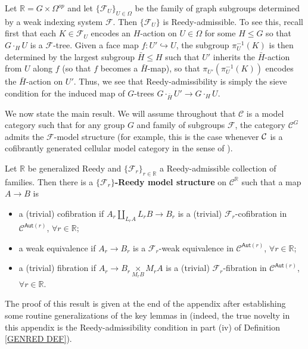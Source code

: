 \documentclass[a4paper,10pt
,draft
]{article}%
\begin{document}
\begin{example}\label{FGRAPHREEDY EX}
	Let $\mathbb{R} = G \times \Omega^{op}$ and let
	$\{\mathcal{F}_U\}_{U \in \Omega}$ be the family of graph subgroups determined by a weak indexing system $\mathcal{F}$.
	Then $\{\mathcal{F}_U\}$ is Reedy-admissible.
	To see this, recall first that each $K \in \mathcal{F}_U$ encodes 
	an $H$-action on $U \in \Omega$ for some $H \leq G$
	so that $G \cdot_H U$ is a $\mathcal{F}$-tree.
	Given a face map $f \colon U' \hookrightarrow U$, 
	the subgroup $\pi^{-1}_U(K)$ is then determined by the largest subgroup $\bar{H}\leq H$ such that 
	$U'$ inherits the $\bar{H}$-action from $U$ along $f$ (so that $f$ becomes a $\bar{H}$-map), 
	so that $\pi_{U'}(\pi^{-1}_U(K))$ encodes the $\bar{H}$-action on $U'$. Thus, we see that Reedy-admissibility is simply the sieve condition for the induced map of $G$-trees
	$G \cdot_{\bar{H}} U' \to G \cdot_H U$.
\end{example}

We now state the main result.
We will assume throughout that $\mathcal{C}$ is a model category such that for any group $G$ and family of subgroups $\mathcal{F}$,
the category $\mathcal{C}^G$ admits the
$\mathcal{F}$-model structure
(for example, this is the case whenever $\mathcal{C}$ is a cofibrantly generated cellular model category in the sense of \cite{Ste16}).


\begin{theorem}\label{REEDYADM THM}
Let $\mathbb{R}$ be generalized Reedy and 
$\{\mathcal{F}_r\}_{r \in \mathbb{R}}$ a Reedy-admissible collection of families. 
Then there is a \textbf{$\{\mathcal{F}_r\}$-Reedy model structure} on
$\mathcal{C}^{\mathbb{R}}$ such that a map $A \to B$ is
\begin{itemize}
  \item a (trivial) cofibration if $A_r \underset{L_r A}{\amalg}L_r B \to B_r$ is a (trivial) $\mathcal{F}_r$-cofibration in $\mathcal{C}^{\mathsf{Aut}(r)}$, $\forall r \in \mathbb{R}$;
	\item a weak equivalence if $A_r \to B_r$ is a $\mathcal{F}_r$-weak equivalence in $\mathcal{C}^{\mathsf{Aut}(r)}$, $\forall r \in \mathbb{R}$;
	\item a (trivial) fibration if $A_r \to B_r \underset{M_r B}{\times }M_r A $ is a (trivial) $\mathcal{F}_r$-fibration in $\mathcal{C}^{\mathsf{Aut}(r)}$, $\forall r \in \mathbb{R}$.
\end{itemize}
\end{theorem}

The proof of this result is given at the end of the appendix after establishing some routine generalizations of the key lemmas in \cite{BM11}
(indeed, the true novelty in this appendix is the Reedy-admissibility condition in part (iv) of Definition \ref{GENRED DEF}).
\end{document}
